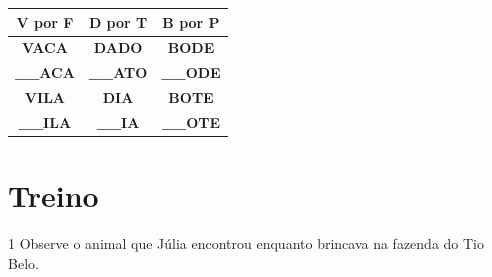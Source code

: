 \begin{table}[H]
\centering
\begin{tabular}{ccc}
\hline
\textbf{V por F} & \textbf{D por T} & \textbf{B por P} \\ \hline
\textbf{VACA}    & \textbf{DADO}    & \textbf{BODE}    \\
\textbf{\_\_ACA} & \textbf{\_\_ATO} & \textbf{\_\_ODE} \\
\textbf{VILA}    & \textbf{DIA}     & \textbf{BOTE}    \\
\textbf{\_\_ILA} & \textbf{\_\_IA}  & \textbf{\_\_OTE} \\ \hline
\end{tabular}
\end{table}







\section*{Treino}

\num{1} Observe o animal que Júlia encontrou enquanto brincava na 
fazenda do Tio Belo.

